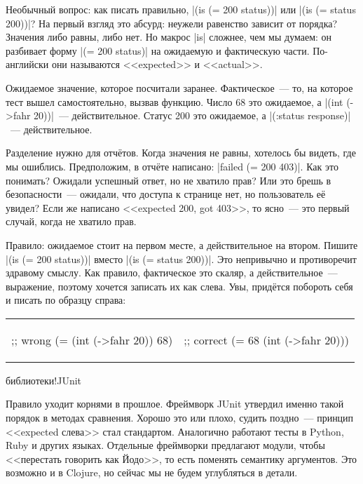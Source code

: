 Необычный вопрос: как писать правильно, \spverb|(is (= 200 status))| или
\spverb|(is (= status 200))|? На первый взгляд это абсурд: неужели равенство
зависит от порядка? Значения либо равны, либо нет. Но макрос \spverb|is|
сложнее, чем мы думаем: он разбивает форму \spverb|(= 200 status)| на ожидаемую
и фактическую части. По-английски они называются <<expected>> и <<actual>>.

Ожидаемое значение, которое посчитали заранее. Фактическое~--- то, на которое
тест вышел самостоятельно, вызвав функцию. Число 68 это ожидаемое, а
\spverb|(int (->fahr 20))|~--- действительное. Статус 200 это ожидаемое, а
\spverb|(:status response)|~--- действительное.

Разделение нужно для отч\"{е}тов. Когда значения не равны, хотелось бы видеть, где
мы ошиблись. Предположим, в отч\"{е}те написано: \spverb|failed (= 200 403)|. Как
это понимать? Ожидали успешный ответ, но не хватило прав? Или это брешь в
безопасности~--- ожидали, что доступа к странице нет, но пользователь е\"{е} увидел?
Если же написано <<expected 200, got 403>>, то ясно~--- это первый случай, когда
не хватило прав.

Правило: ожидаемое стоит на первом месте, а действительное на втором. Пишите
\spverb|(is (= 200 status))| вместо \spverb|(is (= status 200))|. Это непривычно
и противоречит здравому смыслу. Как правило, фактическое это скаляр, а
действительное~--- выражение, поэтому хочется записать их как слева. Увы,
прид\"{е}тся побороть себя и писать по образцу справа:

\noindent
\begin{tabular}{ @{}p{5cm} @{}p{5cm} }

\begin{english}
  \begin{clojure}
;; wrong
(= (int (->fahr 20)) 68)
  \end{clojure}
\end{english}

&

\begin{english}
  \begin{clojure}
;; correct
(= 68 (int (->fahr 20)))
  \end{clojure}
\end{english}

\end{tabular}

библиотеки!JUnit

Правило уходит корнями в прошлое. Фреймворк JUnit утвердил именно такой порядок
в методах сравнения.
Хорошо это или плохо, судить поздно~--- принцип <<expected слева>> стал
стандартом. Аналогично работают тесты в Python, Ruby и других языках. Отдельные
фреймворки предлагают модули, чтобы <<перестать говорить как Йодо>>, то есть
поменять семантику аргументов. Это возможно и в Clojure, но сейчас мы не будем
углубляться в детали.


